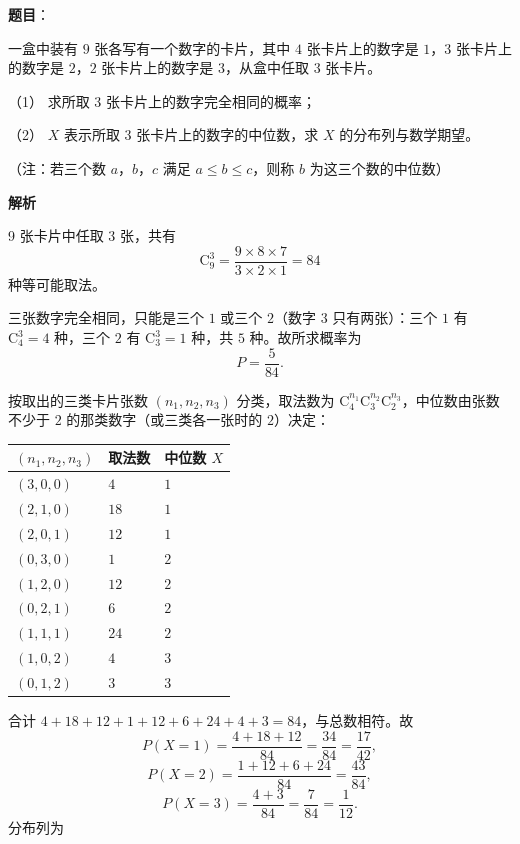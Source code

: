 \begin{answer}

\textbf{题目}：

一盒中装有 $9$ 张各写有一个数字的卡片，其中 $4$ 张卡片上的数字是 $1$，$3$ 张卡片上的数字是 $2$，$2$ 张卡片上的数字是 $3$，从盒中任取 $3$ 张卡片。

（1） 求所取 $3$ 张卡片上的数字完全相同的概率；

（2） $X$ 表示所取 $3$ 张卡片上的数字的中位数，求 $X$ 的分布列与数学期望。

（注：若三个数 $a$，$b$，$c$ 满足 $a\leqslant b\leqslant c$，则称 $b$ 为这三个数的中位数）

\textbf{解析}


9 张卡片中任取 3 张，共有
\nopagebreak[4]
\[\mathrm C_9^3=\frac{9\times8\times7}{3\times2\times1}=84\]
种等可能取法。

三张数字完全相同，只能是三个 $1$ 或三个 $2$（数字 $3$ 只有两张）：三个 $1$ 有 $\mathrm C_4^3=4$ 种，三个 $2$ 有 $\mathrm C_3^3=1$ 种，共 $5$ 种。故所求概率为
\nopagebreak[4]
\[P=\frac5{84}.\]


按取出的三类卡片张数 $(n_1,n_2,n_3)$ 分类，取法数为 $\mathrm C_4^{n_1}\mathrm C_3^{n_2}\mathrm C_2^{n_3}$，中位数由张数不少于 $2$ 的那类数字（或三类各一张时的 $2$）决定：

\begin{center}
\begin{tabular}{lll}
\toprule
$(n_1,n_2,n_3)$ & 取法数 & 中位数 $X$ \\
\midrule
$(3,0,0)$ & $4$ & $1$ \\
$(2,1,0)$ & $18$ & $1$ \\
$(2,0,1)$ & $12$ & $1$ \\
$(0,3,0)$ & $1$ & $2$ \\
$(1,2,0)$ & $12$ & $2$ \\
$(0,2,1)$ & $6$ & $2$ \\
$(1,1,1)$ & $24$ & $2$ \\
$(1,0,2)$ & $4$ & $3$ \\
$(0,1,2)$ & $3$ & $3$ \\
\bottomrule
\end{tabular}
\end{center}

合计 $4+18+12+1+12+6+24+4+3=84$，与总数相符。故
\nopagebreak[4]
\[P(X=1)=\frac{4+18+12}{84}=\frac{34}{84}=\frac{17}{42},\]
\nopagebreak[4]
\[P(X=2)=\frac{1+12+6+24}{84}=\frac{43}{84},\]
\nopagebreak[4]
\[P(X=3)=\frac{4+3}{84}=\frac7{84}=\frac1{12}.\]
分布列为


\end{answer}
